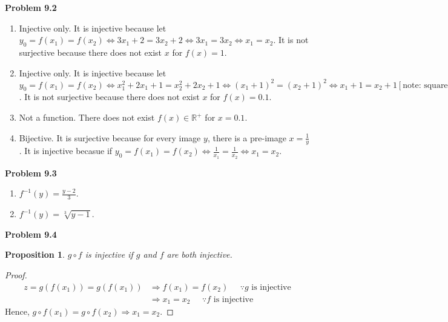 \documentclass{article}
\newtheorem{prop}[thm]{Proposition}
\begin{document}
\textbf{Problem 9.2}
\begin{enumerate}[label={(\roman*)}]
    \item Injective only. It is injective because let $y_0=f(x_1)=f(x_2)\Leftrightarrow 3x_1+2=3x_2+2\Leftrightarrow3x_1=3x_2\Leftrightarrow x_1=x_2$. It is not surjective because there does not exist $x$ for $f(x) = 1$.
    \item Injective only. It is injective because let $y_0=f(x_1)=f(x_2)\Leftrightarrow x_1^2+2x_1+1=x_2^2+2x_2+1\Leftrightarrow(x_1+1)^2=(x_2+1)^2\Leftrightarrow x_1+1=x_2+1[\text{note: square root of both sides are always positive since }x>0]\Leftrightarrow x_1=x_2$. It is not surjective because there does not exist $x$ for $f(x) = 0.1$.
    \item Not a function. There does not exist $f(x) \in \mathbb{R}^+$ for $x=0.1$.
    \item Bijective. It is surjective because for every image $y$, there is a pre-image $x=\frac{1}{y}$. It is injective becasue if $y_0 =f(x_1)=f(x_2)\Leftrightarrow \frac{1}{x_1}=\frac{1}{x_2}\Leftrightarrow x_1=x_2$.
\end{enumerate}
\bigbreak

\textbf{Problem 9.3}
\begin{enumerate}[label={(\roman*)}]
    \item $f^{-1}(y)=\frac{y-2}{3}$.
    \item $f^{-1}(y)=\sqrt[3]{y-1}$.
\end{enumerate}
\bigbreak

\textbf{Problem 9.4}
\begin{prop}
    $g\circ f$ is injective if $g$ and $f$ are both injective.
\end{prop}
\begin{proof}
    \begin{align}
        z = g(f(x_1)) = g(f(x_1)) & \Rightarrow f(x_1) = f(x_2) \;\;\;\;\; \because g \text{ is injective} \\
        & \Rightarrow x_1 = x_2 \;\;\;\;\; \because f \text{ is injective}
    \end{align}
    Hence, $g\circ f(x_1)=g\circ f(x_2)\Rightarrow x_1 = x_2$.
\end{proof}
\bigbreak
\end{document}
